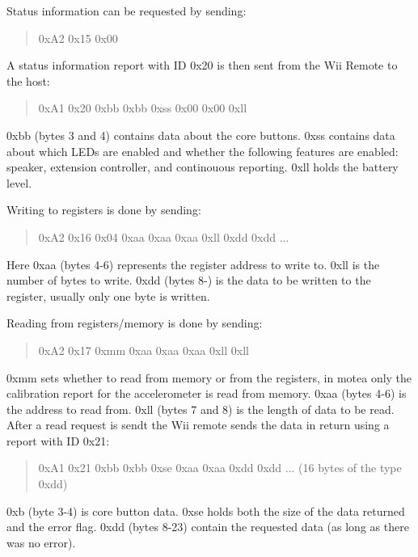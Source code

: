 Status information can be requested by sending:
\begin{quote}
0xA2 0x15 0x00
\end{quote}
A status information report with ID 0x20 is then sent from the Wii Remote to the host:
\begin{quote}
0xA1 0x20 0xbb 0xbb 0xss 0x00 0x00 0xll
\end{quote}
0xbb (bytes 3 and 4) contains data about the core buttons. 0xss contains data about which LEDs are enabled and whether the following features are enabled: speaker, extension controller, and continouous reporting. 0xll holds the battery level. 

Writing to registers is done by sending:
\begin{quote}
0xA2 0x16 0x04 0xaa 0xaa 0xaa 0xll 0xdd 0xdd ...
\end{quote}
Here 0xaa (bytes 4-6) represents the register address to write to. 0xll is the number of bytes to write. 0xdd (bytes 8-) is the data to be written to the register, usually only one byte is written.

Reading from registers/memory is done by sending:
\begin{quote}
0xA2 0x17 0xmm 0xaa 0xaa 0xaa 0xll 0xll
\end{quote}
0xmm sets whether to read from memory or from the registers, in motea only the calibration report for the accelerometer is read from memory. 0xaa (bytes 4-6) is the address to read from. 0xll (bytes 7 and 8) is the length of data to be read. After a read request is sendt the Wii remote sends the data in return using a report with ID 0x21:
\begin{quote}
0xA1 0x21 0xbb 0xbb 0xse 0xaa 0xaa 0xdd 0xdd ... (16 bytes of the type 0xdd)
\end{quote}
0xb (byte 3-4) is core button data. 0xse holds both the size of the data returned and the error flag. 0xdd (bytes 8-23) contain the requested data (as long as there was no error).

